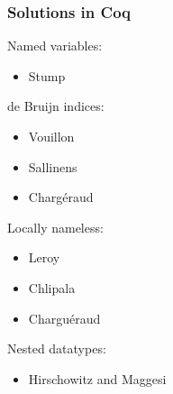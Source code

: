 \documentclass[notheorems]{beamer}
\begin{document}
\begin{frame}

  \frametitle{Solutions in Coq}

  Named variables:
  \begin{itemize}
    \item Stump
  \end{itemize}

  de Bruijn indices:
  \begin{itemize}
    \item Vouillon
    \item Sallinens
    \item Charg\'eraud
  \end{itemize}

  Locally nameless:
  \begin{itemize}
    \item Leroy
    \item Chlipala
    \item Chargu\'eraud
  \end{itemize}

  Nested datatypes:
  \begin{itemize}
    \item Hirschowitz and Maggesi
  \end{itemize}

\end{frame}
\end{document}
